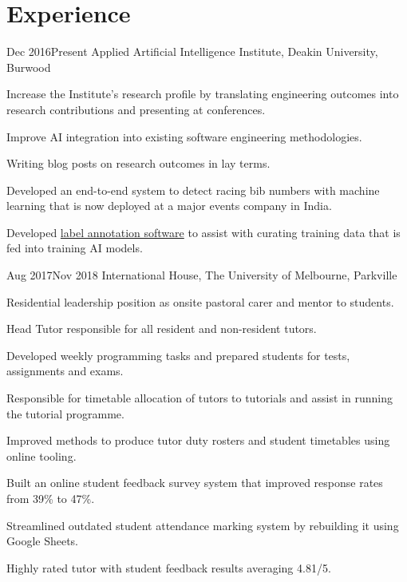\vspace{-1.5mm}
\section{Experience}
\vspace{3mm}

\def \asis{A\textsuperscript{2}I\textsuperscript{2}}

{Dec 2016}{Present}
{Applied Artificial Intelligence Institute, Deakin University, Burwood}
{
  \item Increase the Institute's research profile by translating engineering outcomes into research contributions and presenting at conferences.
  \item Improve AI integration into existing software engineering methodologies.
  \item Writing blog posts on research outcomes in lay terms.
}
{
  \item Developed an end-to-end system to detect racing bib numbers with machine learning that is now deployed at a major events company in India.
  \item Developed \href{http://deakin.edu.au/~ca/argus}{label annotation software} to assist with curating training data that is fed into training AI models.
}

{Aug 2017}{Nov 2018}
{International House, The University of Melbourne, Parkville}
{
  \item Residential leadership position as onsite pastoral carer and mentor to students.
  \item Head Tutor responsible for all resident and non-resident tutors.
  \item Developed weekly programming tasks and prepared students for tests, assignments and exams.
  \item Responsible for timetable allocation of tutors to tutorials and assist in running the tutorial programme.
}
{
  \item Improved methods to produce tutor duty rosters and student timetables using online tooling.
  \item Built an online student feedback survey system that improved response rates from 39\% to 47\%.
  \item Streamlined outdated student attendance marking system by rebuilding it using Google Sheets.
  \item Highly rated tutor with student feedback results averaging 4.81/5.
}

